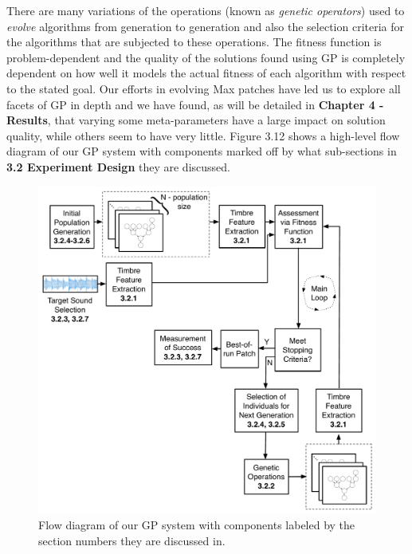\documentclass[a4paper,12pt]{report} 	%
\numberwithin{figure}{chapter}
\numberwithin{table}{chapter}
\numberwithin{equation}{chapter}
\begin{document}
\begin{flushleft}
There are many variations of the operations (known as \emph{genetic operators}) used to \emph{evolve} algorithms from generation to generation and also the selection criteria for the algorithms that are subjected to these operations. The fitness function is problem-dependent and the quality of the solutions found using GP is completely dependent on how well it models the actual fitness of each algorithm with respect to the stated goal. Our efforts in evolving Max patches have led us to explore all facets of GP in depth and we have found, as will be detailed in \textbf{Chapter 4 - Results}, that varying some meta-parameters have a large impact on solution quality, while others seem to have very little. Figure 3.12 shows a high-level flow diagram of our GP system with components marked off by what sub-sections in \textbf{3.2 Experiment Design} they are discussed.
\begin{figure}[h!]
\begin{center}
\includegraphics[scale=0.5]{OverallGPSystem}
\caption[Flow Diagram of Overall GP System]{Flow diagram of our GP system with components labeled by the section numbers they are discussed in.}
\end{center}
\end{figure}
\\
\clearpage

\end{flushleft}
\end{document}

